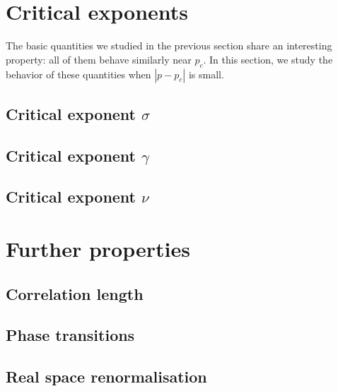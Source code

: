 \section{Critical exponents}

The basic quantities we studied in the previous section share an interesting property: all of them behave similarly near $p_c$. In this section, we study the behavior of these quantities when $|p - p_c|$ is small.

\subsection{Critical exponent $\sigma$}

\subsection{Critical exponent $\gamma$}

\subsection{Critical exponent $\nu$}


\section{Further properties}


\subsection{Correlation length}

\subsection{Phase transitions}

\subsection{Real space renormalisation}




